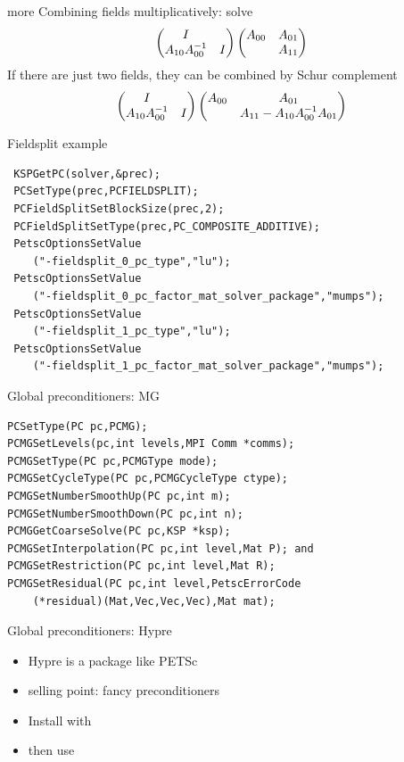 \begin{longstory}
\begin{numberedframe}{more}
Combining fields multiplicatively: solve
\[ 
\begin{pmatrix} I\\ A_{10}A_{00}^{-1}&I \end{pmatrix}
\begin{pmatrix} A_{00}&A_{01}\\ &A_{11} \end{pmatrix}
\]
If there are just two fields, they can be combined by Schur complement
\[ 
\begin{pmatrix} I\\ A_{10}A_{00}^{-1}&I \end{pmatrix}
\begin{pmatrix} A_{00}&A_{01}\\ &A_{11}-A_{10}A_{00}^{-1} A_{01} \end{pmatrix}
\]
\end{numberedframe}

\begin{numberedframe}{Fieldsplit example}
\begin{lstlisting}
 KSPGetPC(solver,&prec);
 PCSetType(prec,PCFIELDSPLIT);
 PCFieldSplitSetBlockSize(prec,2);
 PCFieldSplitSetType(prec,PC_COMPOSITE_ADDITIVE);
 PetscOptionsSetValue
    ("-fieldsplit_0_pc_type","lu");
 PetscOptionsSetValue
    ("-fieldsplit_0_pc_factor_mat_solver_package","mumps");
 PetscOptionsSetValue
    ("-fieldsplit_1_pc_type","lu");
 PetscOptionsSetValue
    ("-fieldsplit_1_pc_factor_mat_solver_package","mumps");
\end{lstlisting}
\end{numberedframe}

\begin{numberedframe}{Global preconditioners: MG}
\begin{lstlisting}
PCSetType(PC pc,PCMG);
PCMGSetLevels(pc,int levels,MPI Comm *comms);
PCMGSetType(PC pc,PCMGType mode);
PCMGSetCycleType(PC pc,PCMGCycleType ctype);
PCMGSetNumberSmoothUp(PC pc,int m);
PCMGSetNumberSmoothDown(PC pc,int n);
PCMGGetCoarseSolve(PC pc,KSP *ksp);
PCMGSetInterpolation(PC pc,int level,Mat P); and
PCMGSetRestriction(PC pc,int level,Mat R);
PCMGSetResidual(PC pc,int level,PetscErrorCode
    (*residual)(Mat,Vec,Vec,Vec),Mat mat);
\end{lstlisting}
\end{numberedframe}

\begin{numberedframe}{Global preconditioners: Hypre}
  \begin{itemize}
  \item Hypre is a package like PETSc
  \item selling point: fancy preconditioners
  \item Install with 
  \item then use 
  \end{itemize}
  

\end{numberedframe}
\end{longstory}
